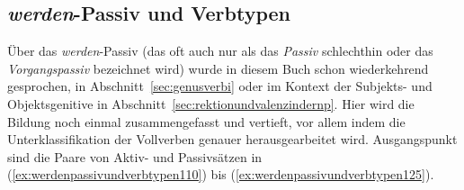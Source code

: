 \subsection{\textit{werden}-Passiv und Verbtypen}
\label{sec:werdenpassivundverbtypen}


Über das \textit{werden}-Passiv (das oft auch nur als das \textit{Passiv} schlechthin oder das \textit{Vorgangspassiv} bezeichnet wird) wurde in diesem Buch schon wiederkehrend gesprochen, \zB in Abschnitt~\ref{sec:genusverbi} oder im Kontext der Subjekts- und Objektsgenitive in Abschnitt~\ref{sec:rektionundvalenzindernp}.
Hier wird die Bildung noch einmal zusammengefasst und vertieft, vor allem indem die Unterklassifikation der Vollverben genauer herausgearbeitet wird.
Ausgangspunkt sind die Paare von Aktiv- und Passivsätzen in (\ref{ex:werdenpassivundverbtypen110}) bis (\ref{ex:werdenpassivundverbtypen125}).

